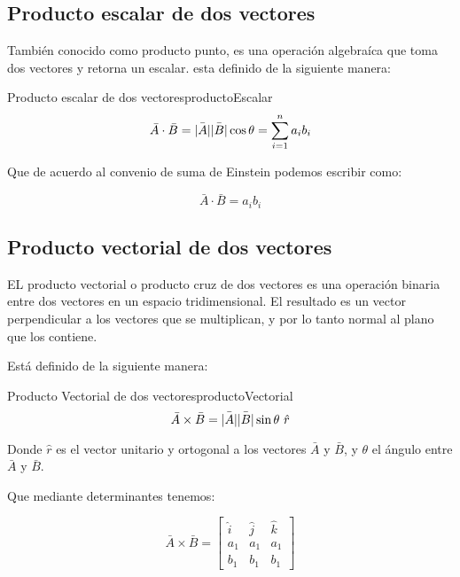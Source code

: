 \subsection{Producto escalar de dos vectores}

También conocido como producto punto, es una operación algebraíca que toma dos
vectores y retorna un escalar. esta definido de la siguiente manera:

\begin{theorem}{Producto escalar de dos vectores}{productoEscalar}
    \begin{equation}
        \bar{A} \cdot \bar{B}= \bar{\lvert A\rvert} \bar{\lvert B\rvert} \cos \theta
        = \sum_{i=1}^{n} a_i b_i
    \end{equation}
\end{theorem}

Que de acuerdo al convenio de suma de Einstein podemos escribir como:

\begin{equation}
    \bar{A} \cdot \bar{B} = a_i b_i
\end{equation}

\subsection{Producto vectorial de dos vectores}

EL producto vectorial o producto cruz de dos vectores es una operación binaria
entre dos vectores en un espacio tridimensional. El resultado es un vector
perpendicular a los vectores que se multiplican, y por lo tanto normal al plano
que los contiene.

Está definido de la siguiente manera:

\begin{theorem}{Producto Vectorial de dos vectores}{productoVectorial}
\begin{equation}
    \bar{A} \times \bar{B}= \bar{\lvert A\rvert} \bar{\lvert B\rvert} \sin \theta \  \hat{r}
\end{equation}
\end{theorem}

Donde $\hat{r}$ es el vector unitario y ortogonal a los vectores $\bar{A}$ y
$\bar{B}$, y $\theta$ el ángulo entre $\bar{A}$ y $\bar{B}$.

Que mediante determinantes tenemos:

\begin{equation}
    \bar{A} \times \bar{B}=
    \begin{bmatrix}
        \hat{i} & \hat{j} & \hat{k}\\ 
         a_1 & a_1 & a_1\\ 
         b_1 & b_1 & b_1
    \end{bmatrix}
\end{equation}

